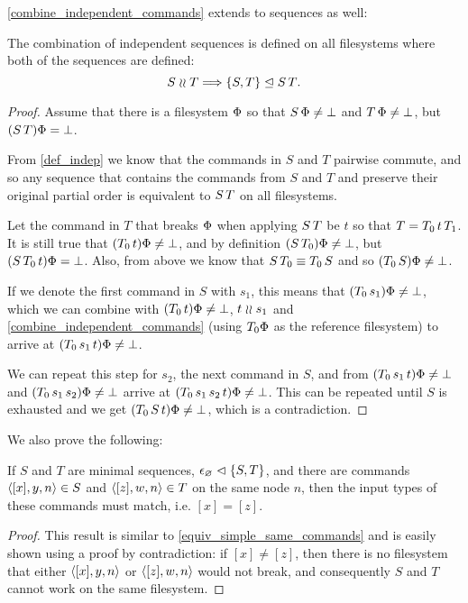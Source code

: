 \cref{combine_independent_commands} extends to sequences as well:

\begin{mylem}
The combination of independent sequences is defined on all filesystems
where both of the sequences are defined:
\[ S\mathrel{\wr\wr} T \Longrightarrow {\{{S,T}\}}\trianglelefteq{S\,T}. \]
\end{mylem}
\begin{proof}
Assume that there is a filesystem $\Phi$ so that
$S\,\Phi\neq\bot$ and $T\,\Phi\neq\bot$, but
$(S\, T)\Phi=\bot$.

From \cref{def_indep} we know that
the commands in $S$ and $T$ pairwise commute, and so any sequence
that contains the commands from $S$ and $T$ and preserve their original partial order
is equivalent to $S\, T$ on all filesystems.

Let the command in $T$ that breaks $\Phi$ when applying $S\, T$ be $t$
so that $T=T_0\, t\, T_1$.
It is still true that $(T_0 \, t)\Phi\neq\bot$,
and by definition $(S\, T_0)\Phi\neq\bot$,
but $(S\, T_0\, t)\Phi=\bot$.
Also, from above we know that $S\, T_0\equiv T_0\, S$
and so $(T_0 \, S)\Phi\neq\bot$.

If we denote the first command in $S$ with $s_1$,
this means that $(T_0 \, s_1)\Phi\neq\bot$,
which we can combine with $(T_0 \, t)\Phi\neq\bot$, $t\mathrel{\wr\wr} s_1$ and
\cref{combine_independent_commands}
(using $T_0\Phi$ as the reference filesystem)
to arrive at $(T_0 \, s_1\, t)\Phi\neq\bot$.

We can repeat this step for $s_2$, the next command in $S$,
and from 
$(T_0 \, s_1\, t)\Phi\neq\bot$
and
$(T_0 \, s_1\, s_2)\Phi\neq\bot$
arrive at
$(T_0 \, s_1\, s_2\, t)\Phi\neq\bot$.
This can be repeated until $S$ is exhausted and we get
$(T_0 \, S\, t)\Phi\neq\bot$, which is a contradiction.
\end{proof}

We also prove the following:

\begin{mylem}
If $S$ and $T$ are minimal sequences, ${\epsilon_\varnothing}\vartriangleleft{\{{S,T}\}}$,
and there are commands $\langle{[x],y,n}\rangle\in S$ and $\langle{[z],w,n}\rangle\in T$ on the same node $n$,
then the input types of these commands must match, i.e. $[x]=[z]$.
\end{mylem}
\begin{proof}
This result is similar to \cref{equiv_simple_same_commands} and
is easily shown using a proof by contradiction: if $[x]\neq [z]$, then there is no filesystem that
either $\langle{[x],y,n}\rangle$ or $\langle{[z],w,n}\rangle$ would not break, 
and consequently $S$ and $T$ cannot work on the same filesystem.
\end{proof}

